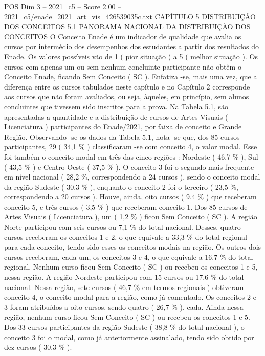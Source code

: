 \begin{textsample}{POS Dim 3 – 2021\_c5 – Score 2.00 – 2021\_c5/enade\_2021\_art\_vis\_426539035c.txt}  \label{ex:f3_pos_088}
CAPÍTULO 5 DISTRIBUIÇÃO DOS CONCEITOS 5.1 PANORAMA NACIONAL DA DISTRIBUIÇÃO DOS CONCEITOS O Conceito Enade é um indicador de qualidade que avalia os cursos por intermédio dos desempenhos dos estudantes a partir dos resultados do Enade.
Os valores possíveis vão de 1 ( pior situação ) a 5 ( melhor situação ).
Os cursos com apenas um ou sem nenhum concluinte participante não obtêm o Conceito Enade, ficando Sem Conceito ( SC ).
Enfatiza -se, mais uma vez, que a diferença entre os cursos tabulados neste capítulo e no Capítulo 2 corresponde aos cursos que não foram avaliados, ou seja, àqueles, em princípio, sem alunos concluintes que tivessem sido inscritos para a prova.
Na Tabela 5.1, são apresentadas a quantidade e a distribuição de cursos de Artes Visuais ( Licenciatura ) participantes do Enade/2021, por faixa de conceito e Grande Região.
Observando -se os dados da Tabela 5.1, nota -se que, dos 85 cursos participantes, 29 ( 34,1 \% ) classificaram -se com conceito 4, o valor modal.
Esse foi também o conceito modal em três das cinco regiões : Nordeste ( 46,7 \% ), Sul ( 43,5 \% ) e Centro-Oeste ( 37,5 \% ).
O conceito 3 foi o segundo mais frequente em nível nacional ( 28,2 \%, correspondendo a 24 cursos ), sendo o conceito modal da região Sudeste ( 30,3 \% ), enquanto o conceito 2 foi o terceiro ( 23,5 \%, correspondendo a 20 cursos ).
Houve, ainda, oito cursos ( 9,4 \% ) que receberam conceito 5, e três cursos ( 3,5 \% ) que receberam conceito 1.
Dos 85 cursos de Artes Visuais ( Licenciatura ), um ( 1,2 \% ) ficou Sem Conceito ( SC ).
A região Norte participou com seis cursos ou 7,1 \% do total nacional.
Desses, quatro cursos receberam os conceitos 1 e 2, o que equivale a 33,3 \% do total regional para cada conceito, tendo sido esses os conceitos modais na região.
Os outros dois cursos receberam, cada um, os conceitos 3 e 4, o que equivale a 16,7 \% do total regional.
Nenhum curso ficou Sem Conceito ( SC ) ou recebeu os conceitos 1 e 5, nessa região.
A região Nordeste participou com 15 cursos ou 17,6 \% do total nacional.
Nessa região, sete cursos ( 46,7 \% em termos regionais ) obtiveram conceito 4, o conceito modal para a região, como já comentado.
Os conceitos 2 e 3 foram atribuídos a oito cursos, sendo quatro ( 26,7 \% ), cada.
Ainda nessa região, nenhum curso ficou Sem Conceito ( SC ) ou recebeu os conceitos 1 e 5.
Dos 33 cursos participantes da região Sudeste ( 38,8 \% do total nacional ), o conceito 3 foi o modal, como já anteriormente assinalado, tendo sido obtido por dez cursos ( 30,3 \% ).

\end{textsample}
